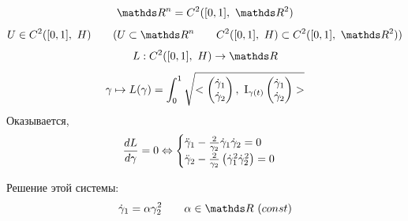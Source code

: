 \documentclass[main]{subfiles}
\begin{document}
    \begin{Utv}
      \[\R^n = C^2 ([0,1],\ \R^2)\]
      \[U \in C^2 ([0,1],\ H) \qq (U \subset \R^n \qq C^2 ([0,1],\ H) \subset C^2 ([0,1],\ \R^2))\]
      \[L: C^2 ([0,1],\ H) \ra \R\]
      \[\gamma \mapsto L(\gamma) = \int_0^1 \sqrt{<\begin{pmatrix}
        \dot{\gamma}_1\\
        \dot{\gamma}_2
      \end{pmatrix},\ \RNumb{1}_{\gamma(t)} \begin{pmatrix}
        \dot{\gamma}_1\\
        \dot{\gamma}_2
      \end{pmatrix}>}\]
      Оказывается,
      \[\frac{d L}{d \gamma} = 0 \Leftrightarrow \begin{cases}
      \ddot{\gamma}_1 - \frac{2}{\gamma_2} \dot{\gamma}_1 \dot{\gamma}_2 = 0\\
      \ddot{\gamma}_2 - \frac{2}{\gamma_2} \left(\dot{\gamma}_1^2 \dot{\gamma}_2^2\right) = 0
      \end{cases}\]
    \end{Utv}

    \begin{utv}
        Решение этой системы:
        \[\dot{\gamma}_1 = \alpha \gamma_2^2 \qq \alpha \in \R \ (const)\]
    \end{utv}
\end{document}
